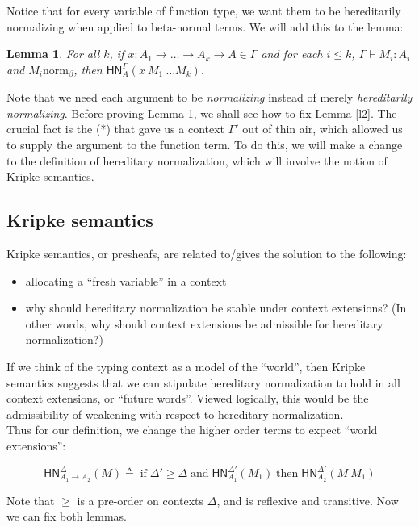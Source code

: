 \documentclass{article}
\newtheorem{lem}[thm]{Lemma}
\newcommand{\hasEF}[3]{\ensuremath{#1 \vdash #2 : #3}}
\newcommand{\bnorm}[1]{\ensuremath{#1 \mathrel{\text{norm}_\beta}}}
\newcommand{\hnorm}[3]{\ensuremath{\mathsf{HN}^{#1}_{#2}(#3)}}
\newcommand{\fn}[2]{\ensuremath{#1 \to #2}}
\newcommand{\ap}[2]{\ensuremath{#1\ #2}}
\begin{document}
Notice that for every variable of function type, we want them to be hereditarily normalizing when applied to 
beta-normal terms. We will add this to the lemma:

\begin{lem}\label{l4}
For all $k$, if $x : A_1 \to \dots \to A_k \to A \in \Gamma$ and for each $i \le k$, $\hasEF{\Gamma}{M_i}{A_i}$ and $\bnorm{M_i}$, then $\hnorm{\Gamma}{A}{\ap{\ap{x}{M_1}}{\dots M_k}}$.
\end{lem}

Note that we need each argument to be \emph{normalizing} instead of merely \emph{hereditarily normalizing}. 
Before proving Lemma \ref{l4}, we shall see how to fix Lemma \ref{l2}. The crucial fact is the (*) that gave us a
context $\Gamma'$
out of thin air, which allowed us to supply the argument to the function term. To do this, we will make a change to 
the definition of hereditary normalization, which will involve the notion of Kripke semantics.

\subsection{Kripke semantics}\label{subsec:kripke_sem}

Kripke semantics, or presheafs, are related to/gives the solution to the following:
\begin{itemize}
\item allocating a ``fresh variable'' in a context
\item why should hereditary normalization be stable under context extensions? (In other words, why should context
extensions be admissible for hereditary normalization?)
\end{itemize}

If we think of the typing context as a model of the ``world'', then Kripke semantics suggests that we can stipulate
hereditary normalization to hold in all context extensions, or ``future words''. Viewed logically, this would be the
admissibility of weakening with respect to hereditary normalization.\\

Thus for our definition, we change the higher order terms to expect ``world extensions'':

\[
\hnorm{\Delta}{\fn{A_1}{A_2}}{M} \triangleq \;\text{if}\; \Delta' \ge \Delta \;\text{and}\; \hnorm{\Delta'}{A_1}{M_1}
\;\text{then}\; \hnorm{\Delta'}{A_2}{\ap{M}{M_1}}
\]

Note that $\ge$ is a pre-order on contexts $\Delta$, and is reflexive and transitive. Now we can fix both lemmas. 
\end{document}
